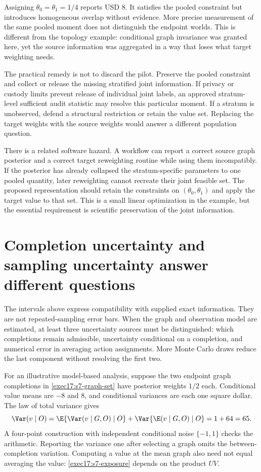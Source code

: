 Assigning $\theta_0=\theta_1=1/4$ reports USD 8. It satisfies the pooled
constraint but introduces homogeneous overlap without evidence. More precise
measurement of the same pooled moment does not distinguish the endpoint
worlds. This is different from the topology example: conditional graph
invariance was granted here, yet the source information was aggregated in a
way that loses what target weighting needs.

The practical remedy is not to discard the pilot. Preserve the pooled
constraint and collect or release the missing stratified joint information.
If privacy or custody limits prevent release of individual joint labels, an
approved stratum-level sufficient audit statistic may resolve this particular
moment. If a stratum is unobserved, defend a structural restriction or retain
the value set. Replacing the target weights with the source weights would
answer a different population question.

There is a related software hazard. A workflow can report a correct source
graph posterior and a correct target reweighting routine while using them
incompatibly. If the posterior has already collapsed the stratum-specific
parameters to one pooled quantity, later reweighting cannot recreate their
joint feasible set. The proposed representation should retain the constraints
on $(\theta_0,\theta_1)$ and apply the target value to that set. This is a
small linear optimization in the example, but the essential requirement is
scientific preservation of the joint information.

\section{Completion uncertainty and sampling uncertainty answer different questions}
\label{exec17:s7-uncertainty}

The intervals above express compatibility with supplied exact information.
They are not repeated-sampling error bars. When the graph and observation
model are estimated, at least three uncertainty sources must be distinguished:
which completions remain admissible, uncertainty conditional on a completion,
and numerical error in averaging action assignments. More Monte Carlo draws
reduce the last component without resolving the first two.

For an illustrative model-based analysis, suppose the two endpoint graph
completions in \eqref{exec17:s7-graph-set} have posterior weights $1/2$ each.
Conditional value means are $-8$ and $8$, and conditional variances are each
one square dollar. The law of total variance gives
\begin{equation}
 \Var(v\mid O)=
 \E\{\Var(v\mid G,O)\mid O\}
 +\Var\{\E(v\mid G,O)\mid O\}=1+64=65.
 \label{exec17:s7-total-variance}
\end{equation}
A four-point construction with independent conditional noise $\{-1,1\}$
checks the arithmetic. Reporting the variance one after selecting a graph
omits the between-completion variation. Computing a value at the mean graph
also need not equal averaging the value: \eqref{exec17:s7-exposure} depends
on the product $UV$.\citep{exec17_s7_math}

